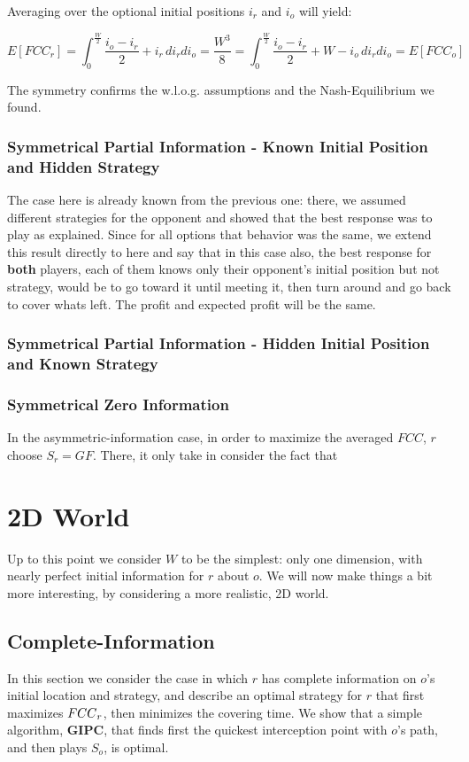 \documentclass[a4paper,10pt]{article}
\newcommand\rob{\ensuremath{r}\xspace}
\newcommand\opp{\ensuremath{o}\xspace}
\newcommand{\w}{\ensuremath{W}\xspace}
\newcommand{\fcc}{\ensuremath{FCC}\xspace}
\newcommand{\gf}{\ensuremath{GF}\xspace}
\begin{document}
Averaging over the optional initial positions $i_{\rob}$ and $i_{\opp}$ will yield:

\[E\left[\fcc_{\rob}\right]=\int_{0}^{\frac{\w}{2}}{\frac{i_{\opp} - i_{\rob}}{2}+i_{\rob}} \, di_{\rob} di_{\opp}=\frac{\w^3}{8}=\int_{0}^{\frac{\w}{2}}{\frac{i_{\opp} - i_{\rob}}{2}+\w-i_{\opp}} \, di_{\rob} di_{\opp}=E\left[\fcc_{\opp}\right]\]

The symmetry confirms the w.l.o.g. assumptions and the Nash-Equilibrium we found.

\subsubsection{Symmetrical Partial Information - Known Initial Position and Hidden Strategy}
The case here is already known from the previous one: there, we assumed different strategies for the opponent and showed that the best response was to play as explained. Since for all options that behavior was the same, we extend this result directly to here and say that in this case also, the best response for \textbf{both} players, each of them knows only their opponent's initial position but not strategy, would be to go toward it until meeting it, then turn around and go back to cover whats left.
The profit and expected profit will be the same.

\subsubsection{Symmetrical Partial Information - Hidden Initial Position and Known Strategy}

\subsubsection{Symmetrical Zero Information}
In the asymmetric-information case, in order to maximize the averaged \fcc, \rob choose $S_\rob=\gf$. There, it only take in consider the fact that




\newpage
\section{2D World}
Up to this point we consider \w to be the simplest: only one dimension, with nearly perfect initial information for \rob about \opp. We will now make things a bit more interesting, by considering a more realistic, 2D world.
\subsection{Complete-Information}
In this section we consider the case in which \rob has complete information on \opp's initial location and strategy, and describe an optimal strategy for \rob that first maximizes $\textnormal{\fcc}_r$, then minimizes the covering time. We show that a simple algorithm, \textbf{GIPC},  that finds first the quickest interception point with \opp's path, and then plays $S_{\opp}$, is optimal.
\end{document}
